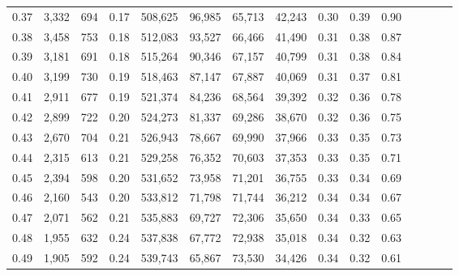 \begin{tabular}{rrrcrrrrrrrrrrr}
0.37 &   3,332 &     694 &                                       0.17 &  508,625 &   96,985 &   65,713 &   42,243 &  0.30 &  0.39 &                         0.90 \\
0.38 &   3,458 &     753 &                                       0.18 &  512,083 &   93,527 &   66,466 &   41,490 &  0.31 &  0.38 &                         0.87 \\
0.39 &   3,181 &     691 &                                       0.18 &  515,264 &   90,346 &   67,157 &   40,799 &  0.31 &  0.38 &                         0.84 \\
0.40 &   3,199 &     730 &                                       0.19 &  518,463 &   87,147 &   67,887 &   40,069 &  0.31 &  0.37 &                         0.81 \\
0.41 &   2,911 &     677 &                                       0.19 &  521,374 &   84,236 &   68,564 &   39,392 &  0.32 &  0.36 &                         0.78 \\
0.42 &   2,899 &     722 &                                       0.20 &  524,273 &   81,337 &   69,286 &   38,670 &  0.32 &  0.36 &                         0.75 \\
0.43 &   2,670 &     704 &                                       0.21 &  526,943 &   78,667 &   69,990 &   37,966 &  0.33 &  0.35 &                         0.73 \\
0.44 &   2,315 &     613 &                                       0.21 &  529,258 &   76,352 &   70,603 &   37,353 &  0.33 &  0.35 &                         0.71 \\
0.45 &   2,394 &     598 &                                       0.20 &  531,652 &   73,958 &   71,201 &   36,755 &  0.33 &  0.34 &                         0.69 \\
0.46 &   2,160 &     543 &                                       0.20 &  533,812 &   71,798 &   71,744 &   36,212 &  0.34 &  0.34 &                         0.67 \\
0.47 &   2,071 &     562 &                                       0.21 &  535,883 &   69,727 &   72,306 &   35,650 &  0.34 &  0.33 &                         0.65 \\
0.48 &   1,955 &     632 &                                       0.24 &  537,838 &   67,772 &   72,938 &   35,018 &  0.34 &  0.32 &                         0.63 \\
0.49 &   1,905 &     592 &                                       0.24 &  539,743 &   65,867 &   73,530 &   34,426 &  0.34 &  0.32 &                         0.61 \\

\end{tabular}

